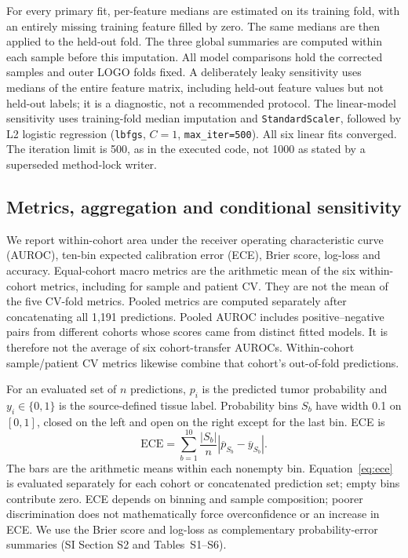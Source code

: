 For every primary fit, per-feature medians are estimated on its training
fold, with an entirely missing training feature filled by zero. The same
medians are then applied to the held-out fold. The three global summaries
are computed within each sample before this imputation. All model
comparisons hold the corrected samples and outer LOGO folds fixed.
A deliberately leaky sensitivity uses medians of the entire feature
matrix, including held-out feature values but not held-out labels; it is
a diagnostic, not a recommended protocol. The linear-model sensitivity
uses training-fold median imputation and \texttt{StandardScaler}, followed
by L2 logistic regression (\texttt{lbfgs}, $C=1$, \texttt{max\_iter=500}).
All six linear fits converged. The iteration limit is 500, as in the
executed code, not 1000 as stated by a superseded method-lock writer.

\subsection{Metrics, aggregation and conditional sensitivity}

We report within-cohort area under the receiver operating characteristic
curve (AUROC), ten-bin expected calibration error (ECE), Brier score,
log-loss and accuracy. Equal-cohort macro metrics are the arithmetic mean
of the six within-cohort metrics, including for sample and patient CV.
They are not the mean of the five CV-fold metrics. Pooled metrics are
computed separately after concatenating all 1{,}191 predictions. Pooled
AUROC includes positive--negative pairs from different cohorts whose
scores came from distinct fitted models. It is therefore not the average
of six cohort-transfer AUROCs. Within-cohort sample/patient CV metrics
likewise combine that cohort's out-of-fold predictions.

For an evaluated set of $n$ predictions, $p_i$ is the predicted tumor
probability and $y_i\in\{0,1\}$ is the source-defined tissue label.
Probability bins $S_b$ have width 0.1 on $[0,1]$, closed on the left
and open on the right except for the last bin. ECE is
\begin{equation}\label{eq:ece}
 \mathrm{ECE}=\sum_{b=1}^{10}\frac{|S_b|}{n}
 \left|\overline p_{S_b}-\overline y_{S_b}\right|.
\end{equation}
The bars are the arithmetic means within each nonempty bin. Equation~\ref{eq:ece}
is evaluated separately for each cohort or concatenated prediction set;
empty bins contribute zero. ECE depends on binning and sample composition;
poorer discrimination does not mathematically force overconfidence or an
increase in ECE. We use the Brier score and log-loss as complementary
probability-error summaries (SI Section S2 and Tables~S1--S6).

